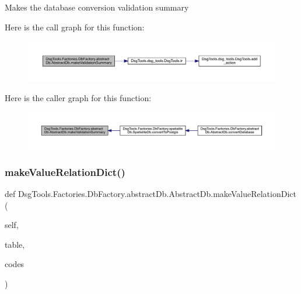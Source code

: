 \begin{DoxyVerb}Makes the database conversion validation summary
\end{DoxyVerb}
 Here is the call graph for this function\+:
\nopagebreak
\begin{figure}[H]
\begin{center}
\leavevmode
\includegraphics[width=350pt]{class_dsg_tools_1_1_factories_1_1_db_factory_1_1abstract_db_1_1_abstract_db_ab71a9b09b67acdec2d5e4152c6d61110_cgraph}
\end{center}
\end{figure}
Here is the caller graph for this function\+:
\nopagebreak
\begin{figure}[H]
\begin{center}
\leavevmode
\includegraphics[width=350pt]{class_dsg_tools_1_1_factories_1_1_db_factory_1_1abstract_db_1_1_abstract_db_ab71a9b09b67acdec2d5e4152c6d61110_icgraph}
\end{center}
\end{figure}
\mbox{\label{class_dsg_tools_1_1_factories_1_1_db_factory_1_1abstract_db_1_1_abstract_db_aaa59942db1d440d487cb90893e12f921}} 
\subsubsection{\texorpdfstring{make\+Value\+Relation\+Dict()}{makeValueRelationDict()}}
{\footnotesize\ttfamily def Dsg\+Tools.\+Factories.\+Db\+Factory.\+abstract\+Db.\+Abstract\+Db.\+make\+Value\+Relation\+Dict (\begin{DoxyParamCaption}\item[{}]{self,  }\item[{}]{table,  }\item[{}]{codes }\end{DoxyParamCaption})}

